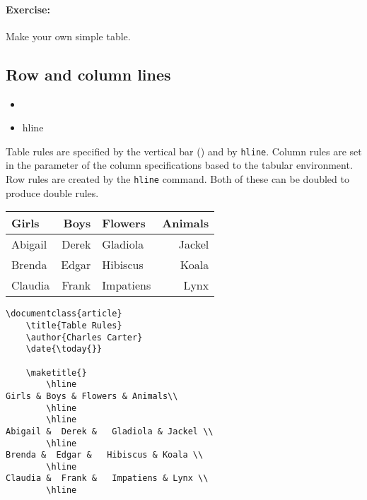         \paragraph{Exercise:} Make your own simple table.

        \subsection{Row and column lines}
        \label{Row and column lines}
        
        \begin{framed}
            \begin{itemize}
                \index{\textbar}
                \item{\textbar}
                \item{hline}
            \end{itemize}
        \end{framed}

        Table rules are specified by the vertical bar (\textbar) and by \texttt{hline}. Column rules are set in the parameter of the column specifications based to the tabular environment. Row rules are created by the \texttt{hline} command. Both of these can be doubled to produce double rules.
        

    \begin{tabular}{| l | r || l | r |}
        \hline
        Girls & Boys & Flowers & Animals\\
        \hline
        \hline
        Abigail &  Derek &   Gladiola & Jackel \\
        \hline
        Brenda &  Edgar &   Hibiscus & Koala \\
        \hline
        Claudia &  Frank &   Impatiens & Lynx \\
        \hline
        \end{tabular}


         \begin{verbatim}
\documentclass{article}
    \title{Table Rules}
    \author{Charles Carter}
    \date{\today{}}
 
    \maketitle{}
        \hline
Girls & Boys & Flowers & Animals\\
        \hline
        \hline
Abigail &  Derek &   Gladiola & Jackel \\
        \hline
Brenda &  Edgar &   Hibiscus & Koala \\
        \hline
Claudia &  Frank &   Impatiens & Lynx \\
        \hline
        \end{verbatim}

